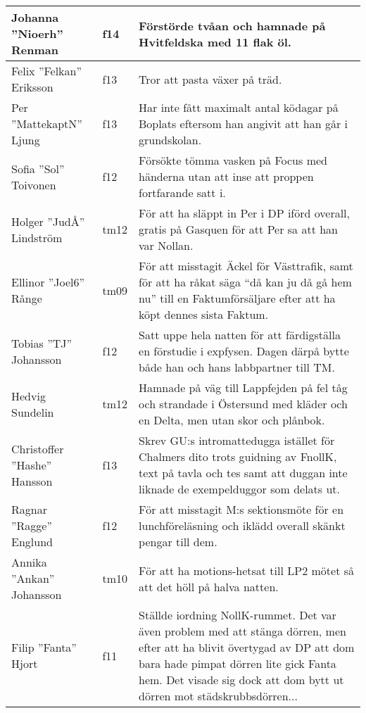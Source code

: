 \begin{longtable}{p{55mm}lp{60mm}}
  Johanna ''Nioerh'' Renman & f14 & Förstörde tvåan och hamnade på Hvitfeldska med 11 flak öl. \\ \hline 

  Felix ''Felkan'' Eriksson & f13 & Tror att pasta växer på träd. \\ \hline 
  
  Per ''MattekaptN'' Ljung & f13 & Har inte fått maximalt antal ködagar på Boplats eftersom han angivit att han går i grundskolan. \\ \hline 
  
  Sofia ''Sol'' Toivonen & f12 & Försökte tömma vasken på Focus med händerna utan att inse att proppen fortfarande satt i. \\ \hline 
  
  Holger ''JudÅ'' Lindström & tm12 & För att ha släppt in Per i DP iförd overall, gratis på Gasquen för att Per sa att han var Nollan. \\ \hline
  
  Ellinor ''Joel6'' Rånge & tm09 & För att misstagit Äckel för Västtrafik, samt för att ha råkat säga ``då kan ju då gå hem nu'' till en Faktumförsäljare efter att ha köpt dennes sista Faktum.\\ \hline
  
  Tobias ''TJ'' Johansson & f12 & Satt uppe hela natten för att färdigställa en förstudie i expfysen. Dagen därpå bytte både
  han och hans labbpartner till TM.\\ \hline

  Hedvig Sundelin & tm12 & Hamnade på väg till Lappfejden på fel tåg och strandade i Östersund med kläder och en Delta, men utan skor och plånbok.\\ \hline
  
  Christoffer ''Hashe'' Hansson &  f13 & Skrev GU:s intromattedugga istället för Chalmers dito trots guidning av FnollK, text på tavla och tes samt att duggan inte liknade de exempelduggor som delats ut.\\ \hline
    
Ragnar ''Ragge'' Englund &  f12 & För att misstagit M:s sektionsmöte för en lunchföreläsning och 
iklädd overall skänkt pengar till dem. \\ \hline

Annika ''Ankan'' Johansson & tm10 & För att ha motions-hetsat till LP2 mötet så att det höll 
på halva natten.  \\ \hline

Filip ''Fanta'' Hjort & f11 & Ställde  iordning NollK-rummet. Det var även problem med att stänga dörren, men efter att ha blivit övertygad av DP att dom bara hade pimpat dörren lite gick Fanta hem. Det visade sig dock att dom bytt ut dörren mot städskrubbsdörren...\\ \hline


\end{longtable}
